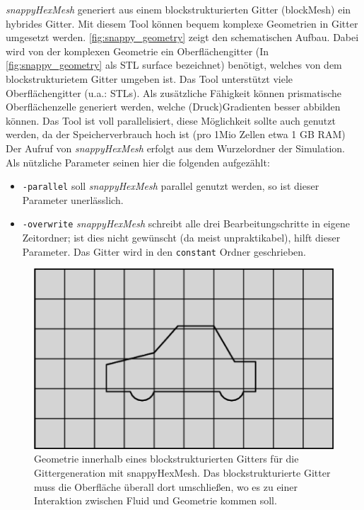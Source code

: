 \textit{snappyHexMesh} generiert aus einem blockstrukturierten Gitter (blockMesh) ein hybrides Gitter. Mit diesem Tool können bequem komplexe Geometrien in Gitter umgesetzt werden. \autoref{fig:snappy_geometry} zeigt den schematischen Aufbau. Dabei wird von der komplexen Geometrie ein Oberflächengitter (In \autoref{fig:snappy_geometry} als STL surface bezeichnet) benötigt, welches von dem blockstrukturietem Gitter umgeben ist. Das Tool unterstützt viele Oberflächengitter (u.a.: STLs). Als zusätzliche Fähigkeit können prismatische Oberflächenzelle generiert werden, welche (Druck)Gradienten besser abbilden können. Das Tool ist voll parallelisiert, diese Möglichkeit sollte auch genutzt werden, da der Speicherverbrauch hoch ist (pro 1Mio Zellen etwa 1 GB RAM)
\\
Der Aufruf von \textit{snappyHexMesh} erfolgt aus dem Wurzelordner der Simulation. Als nützliche Parameter seinen hier die folgenden aufgezählt:
\begin{itemize}
	\item \texttt{-parallel} soll \textit{snappyHexMesh} parallel genutzt werden, so ist dieser Parameter unerlässlich.
	\item \texttt{-overwrite} \textit{snappyHexMesh} schreibt alle drei Bearbeitungschritte in eigene Zeitordner; ist dies nicht gewünscht (da meist unpraktikabel), hilft dieser Parameter. Das Gitter wird in den \texttt{constant} Ordner geschrieben.
\end{itemize}
\begin{figure}
\centering
\includegraphics[width=0.7\linewidth]{Abbildungen/snappy_geometry2}
\caption[Geometriedefinition snappyHexMesh]{Geometrie innerhalb eines blockstrukturierten Gitters für die Gittergeneration mit snappyHexMesh. Das blockstrukturierte Gitter muss die Oberfläche überall dort umschließen, wo es zu einer Interaktion zwischen Fluid und Geometrie kommen soll.}
\label{fig:snappy_geometry}
\end{figure}


